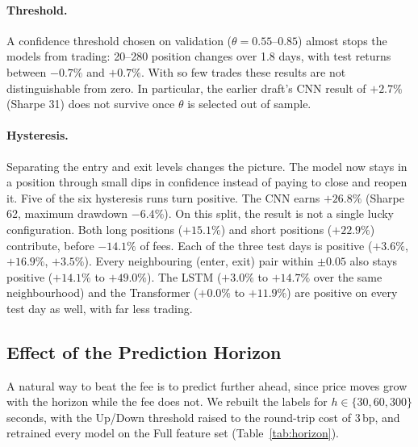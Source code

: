 \paragraph{Threshold.} A confidence threshold chosen on validation ($\theta = 0.55$--$0.85$)
almost stops the models from trading: 20--280 position changes over 1.8 days, with test
returns between $-0.7\%$ and $+0.7\%$. With so few trades these results are not
distinguishable from zero. In particular, the earlier draft's CNN result of $+2.7\%$
(Sharpe 31) does not survive once $\theta$ is selected out of sample.

\paragraph{Hysteresis.} Separating the entry and exit levels changes the picture. The
model now stays in a position through small dips in confidence instead of paying to close
and reopen it. Five of the six hysteresis runs turn positive. The CNN earns $+26.8\%$
(Sharpe 62, maximum drawdown $-6.4\%$). On this split, the result is not a single lucky
configuration. Both long positions ($+15.1\%$) and short positions ($+22.9\%$) contribute,
before $-14.1\%$ of fees. Each of the three test days is positive ($+3.6\%$, $+16.9\%$,
$+3.5\%$). Every neighbouring (enter, exit) pair within $\pm 0.05$ also stays positive
($+14.1\%$ to $+49.0\%$). The LSTM ($+3.0\%$ to $+14.7\%$ over the same neighbourhood)
and the Transformer ($+0.0\%$ to $+11.9\%$) are positive on every test day as well, with
far less trading.

\subsection{Effect of the Prediction Horizon}
\label{sec:horizon}

A natural way to beat the fee is to predict further ahead, since price moves grow with
the horizon while the fee does not. We rebuilt the labels for $h \in \{30, 60, 300\}$
seconds, with the Up/Down threshold raised to the round-trip cost of 3\,bp, and retrained
every model on the Full feature set (Table~\ref{tab:horizon}).

